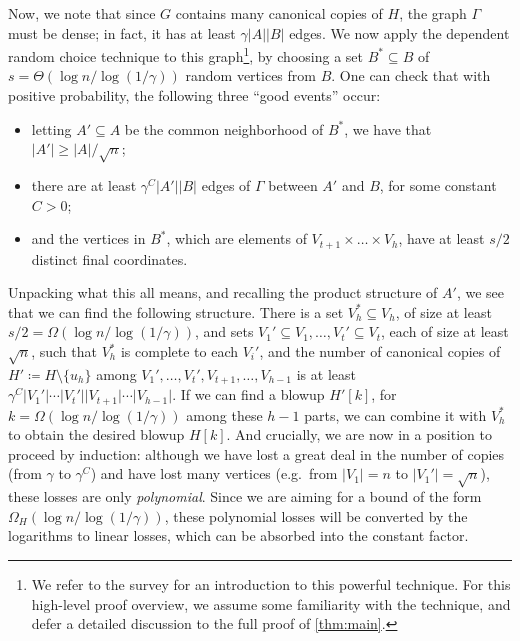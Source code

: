 \documentclass[11pt]{article}
\numberwithin{equation}{section}
\theoremstyle{plain}
\theoremstyle{remark}
\newcommand\ab[1]{\lvert #1 \rvert}
\begin{document}
Now, we note that since $G$ contains many canonical copies of $H$, the graph $\Gamma$ must be dense; in fact, it has at least $\gamma \ab A \ab B$ edges. We now apply the dependent random choice technique to this graph\footnote{We refer to the survey \cite{MR2768884} for an introduction to this powerful technique. For this high-level proof overview, we assume some familiarity with the technique, and defer a detailed discussion to the full proof of \cref{thm:main}.}, by choosing a set $B^*\subseteq B$ of $s = \Theta(\log n/{\log (1/\gamma)})$ random vertices from $B$. One can check that with positive probability, the following three ``good events'' occur:
\begin{itemize}
    \item letting $A'\subseteq A$ be the common neighborhood of $B^*$, we have that $\ab{A'} \geq \ab A/{\sqrt n}$;
    \item there are at least $\gamma^C \ab{A'} \ab B$ edges of $\Gamma$ between $A'$ and $B$, for some constant $C>0$;
    \item and the vertices in $B^*$, which are elements of $V_{t+1}\times \dots \times V_h$, have at least $s/2$ distinct final coordinates.
\end{itemize}
Unpacking what this all means, and recalling the product structure of $A'$, we see that we can find the following structure. There is a set $V_h^* \subseteq V_h$, of size at least $s/2 = \Omega(\log n/{\log(1/\gamma)})$, and sets $V_1' \subseteq V_1,\dots,V_t' \subseteq V_t$, each of size at least $\sqrt n$, such that $V_h^*$ is complete to each $V_i'$, and the number of canonical copies of $H' \coloneqq H\setminus \{u_h\}$ among $V_1',\dots,V_t',V_{t+1},\dots,V_{h-1}$ is at least $\gamma^C \ab{V_1'}\dotsb \ab{V_t'}\ab{V_{t+1}}\dotsb\ab{V_{h-1}}$. If we can find a blowup $H'[k]$, for $k = \Omega(\log n/{\log(1/\gamma)})$ among these $h-1$ parts, we can combine it with $V_h^*$ to obtain the desired blowup $H[k]$. And crucially, we are now in a position to proceed by induction: although we have lost a great deal in the number of copies (from $\gamma$ to $\gamma^C$) and have lost many vertices (e.g.\ from $\ab{V_1}=n$ to $\ab{V_1'}=\sqrt n$), these losses are only \emph{polynomial}. Since we are aiming for a bound of the form $\Omega_H(\log n/{\log(1/\gamma)})$, these polynomial losses will be converted by the logarithms to linear losses, which can be absorbed into the constant factor. 
\end{document}
